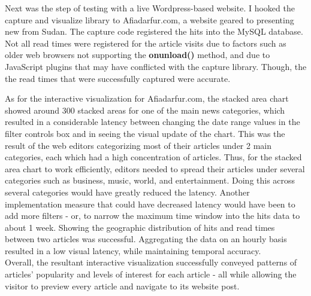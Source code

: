 \documentclass[12pt]{article}
\begin{document}
Next was the step of testing with a live Wordpress-based website. I hooked the capture and visualize library to Afiadarfur.com, a website geared to presenting new from Sudan. The capture code registered the hits into the MySQL database. Not all read times were registered for the article visits due to factors such as older web browsers not supporting the \textbf{onunload()} method, and due to JavaScript plugins that may have conflicted with the capture library. Though, the the read times that were successfully captured were accurate. 
  
As for the interactive visualization for Afiadarfur.com, the stacked area chart showed around 300 stacked areas for one of the main news categories, which resulted in a considerable latency between changing the date range values in the filter controls box and in seeing the visual update of the chart. This was the result of the web editors categorizing most of their articles under 2 main categories, each which had a high concentration of articles. Thus, for the stacked area chart to work efficiently, editors needed to spread their articles under several categories such as business, music, world, and entertainment. Doing this across several categories would have greatly reduced the latency. Another implementation measure that could have decreased latency would have been to add more filters - or, to narrow the maximum time window into the hits data to about 1 week. 
Showing the geographic distribution of hits and read times between two articles was successful. Aggregating the data on an hourly basis resulted in a low visual latency, while maintaining temporal accuracy. \\

Overall, the resultant interactive visualization successfully conveyed patterns of articles' popularity and levels of interest for each article - all while allowing the visitor to preview every article and navigate to its website post.

\newpage
\end{document}
